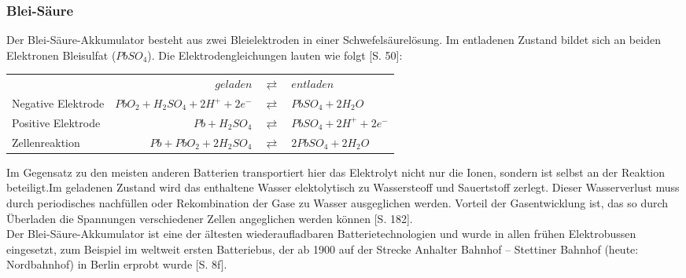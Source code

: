 \subsubsection{Blei-Säure}
Der Blei-Säure-Akkumulator besteht aus zwei Bleielektroden in einer Schwefelsäurelösung. Im entladenen Zustand bildet sich an beiden Elektronen Bleisulfat ($PbSO_4$). Die Elektrodengleichungen lauten wie folgt \cite{KiehneBattery}[S. 50]:
\begin{table*}[htbp]
  \begin{tabularx}{\linewidth}{XrcX}
  	                   &                       $geladen$ & $\rightleftarrows$ & $entladen$            \\
  	Negative Elektrode & $PbO_2 + H_2SO_4 + 2H^+ + 2e^-$ & $\rightleftarrows$ & $PbSO_4 + 2H_2O$       \\
  	Positive Elektrode &                  $Pb + H_2SO_4$ & $\rightleftarrows$ & $PbSO_4 + 2H^+ + 2e^-$ \\ \midrule
  	Zellenreaktion     &         $Pb + PbO_2 + 2H_2SO_4$ & $\rightleftarrows$ & $2PbSO_4 + 2H_2O$
  \end{tabularx}
\end{table*}
Im Gegensatz zu den meisten anderen Batterien transportiert hier das Elektrolyt nicht nur die Ionen, sondern ist selbst an der Reaktion beteiligt.Im geladenen Zustand wird das enthaltene Wasser elektolytisch zu Wassersteoff und Sauertstoff zerlegt. Dieser Wasserverlust muss durch periodisches nachfüllen oder Rekombination der Gase zu Wasser ausgeglichen werden. Vorteil der Gasentwicklung ist, das so durch Überladen die Spannungen verschiedener Zellen angeglichen werden können \cite{tub_aleph001746639}[S. 182].\\
Der Blei-Säure-Akkumulator ist eine der ältesten wiederaufladbaren Batterietechnologien und wurde in allen frühen Elektrobussen eingesetzt, zum Beispiel im weltweit ersten Batteriebus, der ab 1900 auf der Strecke Anhalter Bahnhof – Stettiner Bahnhof (heute: Nordbahnhof) in Berlin erprobt wurde \cite{Risch:1957}[S. 8f].

